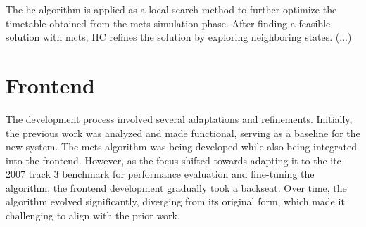 The \ac{hc} algorithm is applied as a local search method to further optimize the timetable obtained from the \ac{mcts} simulation phase. After finding a feasible solution with \ac{mcts}, \ac{HC} refines the solution by exploring neighboring states. 
(...)

\section{Frontend}

The development process involved several adaptations and refinements. Initially, the previous work was analyzed and made functional, serving as a baseline for the new system. The \ac{mcts} algorithm was being developed while also being integrated into the frontend. However, as the focus shifted towards adapting it to the \ac{itc-2007} track 3 benchmark for performance evaluation and fine-tuning the algorithm, the frontend development gradually took a backseat. Over time, the algorithm evolved significantly, diverging from its original form, which made it challenging to align with the prior work.

